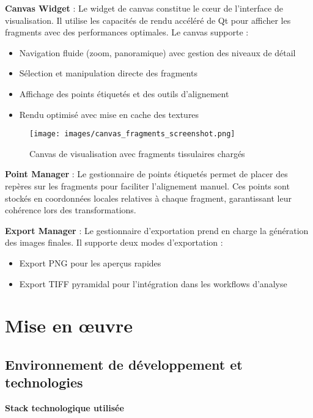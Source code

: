 \documentclass[12pt,a4paper]{report}
\begin{document}
\begin{}
\begin{}
\begin{}
\begin{}
\textbf{Canvas Widget} : Le widget de canvas constitue le cœur de l'interface de visualisation. Il utilise les capacités de rendu accéléré de Qt pour afficher les fragments avec des performances optimales. Le canvas supporte :
\begin{itemize}
\item Navigation fluide (zoom, panoramique) avec gestion des niveaux de détail
\item Sélection et manipulation directe des fragments
\item Affichage des points étiquetés et des outils d'alignement
\item Rendu optimisé avec mise en cache des textures
\end{itemize}

\begin{figure}[H]
\centering
\texttt{[image: images/canvas\_fragments\_screenshot.png]}
\caption{Canvas de visualisation avec fragments tissulaires chargés}
\label{fig:canvas_fragments}
\end{figure}

\textbf{Point Manager} : Le gestionnaire de points étiquetés permet de placer des repères sur les fragments pour faciliter l'alignement manuel. Ces points sont stockés en coordonnées locales relatives à chaque fragment, garantissant leur cohérence lors des transformations.

\textbf{Export Manager} : Le gestionnaire d'exportation prend en charge la génération des images finales. Il supporte deux modes d'exportation :
\begin{itemize}
\item Export PNG pour les aperçus rapides
\item Export TIFF pyramidal pour l'intégration dans les workflows d'analyse
\end{itemize}

\section{Mise en œuvre}

\vspace{0.5em}

\subsection{Environnement de développement et technologies}

\vspace{1em}
\begin{center}
\textbf{\large Stack technologique utilisée}
\end{center}
\vspace{0.5em}


\end{}
\end{}
\end{}
\end{}
\end{document}
